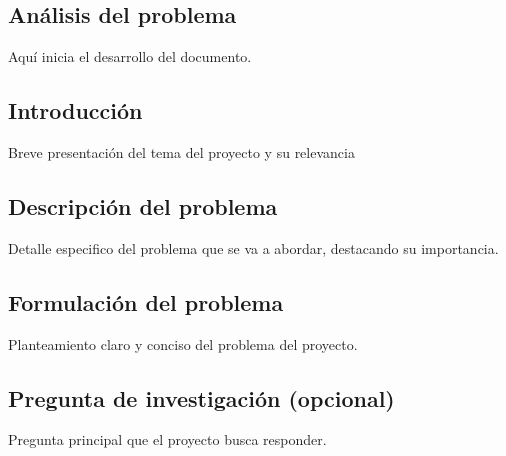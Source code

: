 \documentclass[12pt,letterpaper]{report}
\begin{document}
	\thispagestyle{empty}
	\newpage
	
	\configurarIndices
    \tableofcontents
    \thispagestyle{empty}
    \newpage
    \listoffigures
    \thispagestyle{empty}
    \newpage
    \listoftables
    \thispagestyle{empty}
    \newpage
	
	
	\iniciarNumeracion
	\renewcommand{\thesection}{\arabic{section}}
	\begin{center}
	\section{Análisis del problema}
	\end{center}
	
	Aquí inicia el desarrollo del documento.
	\subsection{Introducción}
	Breve presentación del tema del proyecto y su relevancia
	\subsection{Descripción del problema}
	Detalle especifico del problema que se va a abordar, destacando su importancia.
	\subsection{Formulación del problema}
	Planteamiento claro y conciso del problema del proyecto.
	\subsection{Pregunta de investigación (opcional)}
	Pregunta principal que el proyecto busca responder.
\end{document}
